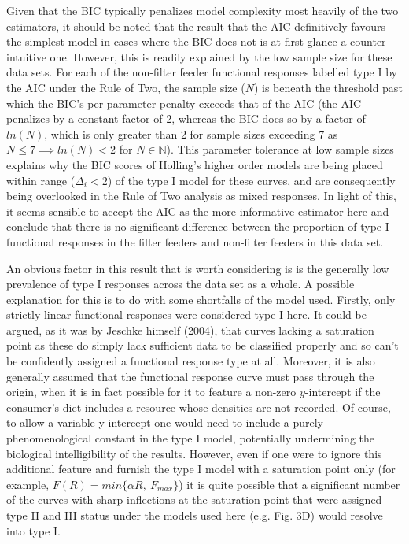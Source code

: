 \documentclass[11pt]{article}
\begin{document}
    Given that the BIC typically penalizes model complexity most heavily of the two estimators, it should be noted that the result that the AIC definitively favours the simplest model in cases where the BIC does not is at first glance a counter-intuitive one. However, this is readily explained by the low sample size for these data sets. For each of the non-filter feeder functional responses labelled type I by the AIC under the Rule of Two, the sample size ($N$) is beneath the threshold past which the BIC's per-parameter penalty exceeds that of the AIC (the AIC penalizes by a constant factor of 2, whereas the BIC does so by a factor of $ln(N)$, which is only greater than 2 for sample sizes exceeding 7 as $N \leq 7\implies ln(N)<2$ for $N\in\mathbb{N}$). This parameter tolerance at low sample sizes explains why the BIC scores of Holling's higher order models are being placed within range ($\Delta_i<2$) of the type I model for these curves, and are consequently being overlooked in the Rule of Two analysis as mixed responses. In light of this, it seems sensible to accept the AIC as the more informative estimator here and conclude that there is no significant difference between the proportion of type I functional responses in the filter feeders and non-filter feeders in this data set.
    
    An obvious factor in this result that is worth considering is is the generally low prevalence of type I responses across the data set as a whole. A possible explanation for this is to do with some shortfalls of the model used. Firstly, only strictly linear functional responses were considered type I here. It could be argued, as it was by Jeschke himself (2004), that curves lacking a saturation point as these do simply lack sufficient data to be classified properly and so can't be confidently assigned a functional response type at all. 
    Moreover, it is also generally assumed that the functional response curve must pass through the origin, when it is in fact possible for it to feature a non-zero $y$-intercept if the consumer's diet includes a resource whose densities are not recorded. Of course, to allow a variable y-intercept one would need to include a purely phenomenological constant in the type I model, potentially undermining the biological intelligibility of the results. However, even if one were to ignore this additional feature and furnish the type I model with a saturation point only (for example, $F(R)=min\{\alpha R,\:F_{max}\}$) it is quite possible that a significant number of the curves with sharp inflections at the saturation point that were assigned type II and III status under the models used here (e.g. Fig. 3D) would resolve into type I.
    
\end{document}
